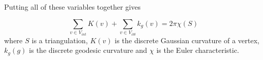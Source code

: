 Putting all of these variables together gives

\begin{theorem} \label{thm:g-b-d}

$$\sum_{v\in V_{int}} K(v) + \sum_{v\in V_{\partial S}} k_g(v) = 2\pi \chi(S)$$
where $S$ is a triangulation, $K(v)$ is the discrete Gaussian curvature
of a vertex, $k_g(g)$ is the discrete geodesic curvature and
$\chi$ is the Euler characteristic.
\end{theorem}



